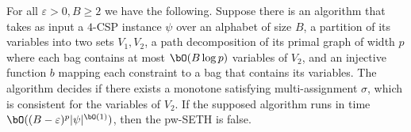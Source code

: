 \begin{corollary}\label{cor:weird}
    For all $\varepsilon>0, B \ge 2$ we have the following.
    Suppose there is an algorithm that takes as input a $4$-\textsc{CSP} instance $\psi$ over
    an alphabet of size $B$,
    a partition of its variables into two sets $V_1, V_2$,
    a path decomposition of its primal graph of width $p$ where each bag contains at most
    $\bO (B \log p)$ variables of $V_2$,
    and an injective function $b$ mapping each constraint to a bag that contains its variables.
    The algorithm decides if there exists a monotone satisfying multi-assignment $\sigma$,
    which is consistent for the variables of $V_2$.
    If the supposed algorithm runs in time $\bO ( (B-\varepsilon)^p |\psi|^{\bO(1)})$,
    then the pw-SETH is false.
\end{corollary}
